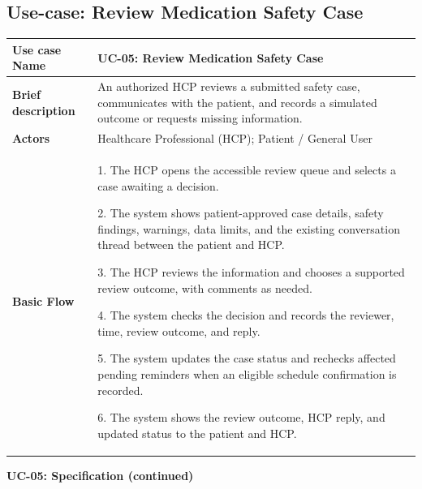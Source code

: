\subsection{Use-case: Review Medication Safety Case}
\label{uc:uc-05}


\begin{longtable}{|p{}|p{}|}
\hline
\textbf{Use case Name} & UC-05: Review Medication Safety Case \\ \hline

\textbf{Brief description} &
An authorized HCP reviews a submitted safety case, communicates with the patient, and records a simulated outcome or requests missing information.
\\ \hline

\textbf{Actors} &
Healthcare Professional (HCP); Patient / General User
\\ \hline

\textbf{Basic Flow} &
1. The HCP opens the accessible review queue and selects a case awaiting a decision.\par
2. The system shows patient-approved case details, safety findings, warnings, data limits, and the existing conversation thread between the patient and HCP.\par
3. The HCP reviews the information and chooses a supported review outcome, with comments as needed.\par
4. The system checks the decision and records the reviewer, time, review outcome, and reply.\par
5. The system updates the case status and rechecks affected pending reminders when an eligible schedule confirmation is recorded.\par
6. The system shows the review outcome, HCP reply, and updated status to the patient and HCP.
\\ \hline

\end{longtable}
\clearpage
\noindent\textbf{UC-05: Specification (continued)}
